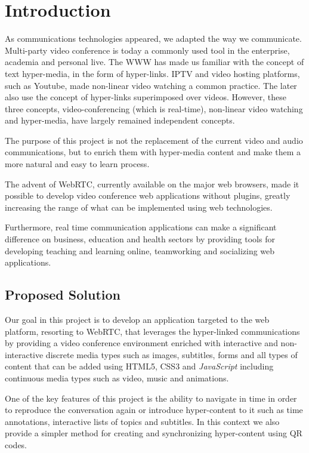 \documentclass[10pt,conference]{IEEEtran}
\begin{document}
\section{Introduction}
\label{chapter:introduction}


As communications technologies appeared, we adapted the way we communicate. 
Multi-party video conference is today a commonly used tool in the enterprise, academia and personal live.
The \gls{WWW} has made us familiar with the concept of text hyper-media, in the form of hyper-links.
\gls{IPTV} and video hosting platforms, such as Youtube, made non-linear video watching a common practice.
The later also use the concept of hyper-links superimposed over videos.
However, these three concepts, video-conferencing (which is real-time), non-linear video watching and hyper-media, have largely remained independent concepts.




The purpose of this project is not the replacement of the current video and audio communications, but to enrich them with hyper-media content and make them a more natural and easy to learn process. 

The advent of \gls{WebRTC}, currently available on the major web browsers, made it possible to develop video conference web applications without plugins, greatly increasing the range of what can be implemented using web technologies.
		
    Furthermore, real time communication applications can make a significant difference on business, education and health sectors by providing tools for developing teaching and learning online, teamworking and socializing web applications.

\subsection{Proposed Solution}
\label{section:proposed}

	Our goal in this project is to develop an application targeted to the web platform, resorting to \gls{WebRTC}, that leverages the hyper-linked communications by providing a video conference environment enriched with interactive and non-interactive discrete media types such as images, subtitles, forms and all types of content that can be added using \gls{HTML}5, \gls{CSS}3 and \emph{JavaScript} including continuous media types such as video, music and animations.

	One of the key features of this project is the ability to navigate in time in order to reproduce the conversation again or introduce hyper-content to it such as time annotations, interactive lists of topics and subtitles. In this context we also provide a simpler method for creating and synchronizing hyper-content using \gls{QR} codes.
\end{document}
